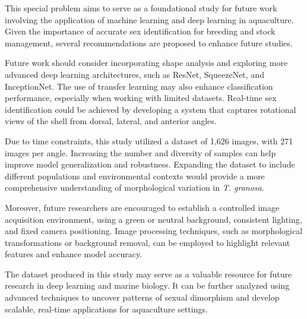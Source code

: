 This special problem aims to serve as a foundational study for future work involving the application of machine learning and deep learning in aquaculture. Given the importance of accurate sex identification for breeding and stock management, several recommendations are proposed to enhance future studies.

Future work should consider incorporating shape analysis and exploring more advanced deep learning architectures, such as ResNet, SqueezeNet, and InceptionNet. The use of transfer learning may also enhance classification performance, especially when working with limited datasets. Real-time sex identification could be achieved by developing a system that captures rotational views of the shell from dorsal, lateral, and anterior angles.

Due to time constraints, this study utilized a dataset of 1,626 images, with 271 images per angle. Increasing the number and diversity of samples can help improve model generalization and robustness. Expanding the dataset to include different populations and environmental contexts would provide a more comprehensive understanding of morphological variation in \textit{T. granosa}.

Moreover, future researchers are encouraged to establish a controlled image acquisition environment, using a green or neutral background, consistent lighting, and fixed camera positioning. Image processing techniques, such as morphological transformations or background removal, can be employed to highlight relevant features and enhance model accuracy.

The dataset produced in this study may serve as a valuable resource for future research in deep learning and marine biology. It can be further analyzed using advanced techniques to uncover patterns of sexual dimorphism and develop scalable, real-time applications for aquaculture settings.